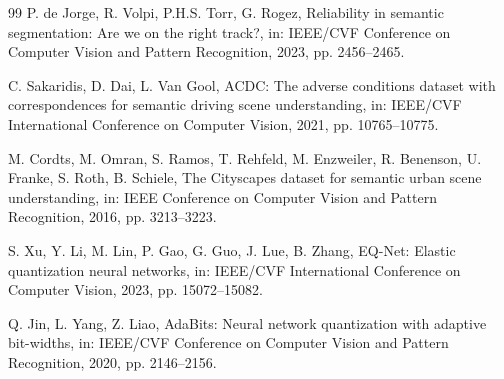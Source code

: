\documentclass[a4paper,review,12pt]{elsarticle}
\begin{document}
\begin{thebibliography}{99}
P. de Jorge, R. Volpi, P.H.S. Torr, G. Rogez,
Reliability in semantic segmentation: Are we on the right track?,
in: IEEE/CVF Conference on Computer Vision and Pattern Recognition, 2023, pp. 2456--2465.

C. Sakaridis, D. Dai, L. Van Gool,
ACDC: The adverse conditions dataset with correspondences for semantic driving scene understanding,
in: IEEE/CVF International Conference on Computer Vision, 2021, pp. 10765--10775.

M. Cordts, M. Omran, S. Ramos, T. Rehfeld, M. Enzweiler, R. Benenson, U. Franke, S. Roth, B. Schiele,
The Cityscapes dataset for semantic urban scene understanding,
in: IEEE Conference on Computer Vision and Pattern Recognition, 2016, pp. 3213--3223.

S. Xu, Y. Li, M. Lin, P. Gao, G. Guo, J. Lue, B. Zhang,
EQ-Net: Elastic quantization neural networks,
in: IEEE/CVF International Conference on Computer Vision, 2023, pp. 15072--15082.

Q. Jin, L. Yang, Z. Liao,
AdaBits: Neural network quantization with adaptive bit-widths,
in: IEEE/CVF Conference on Computer Vision and Pattern Recognition, 2020, pp. 2146--2156.

\end{thebibliography}
\end{document}
